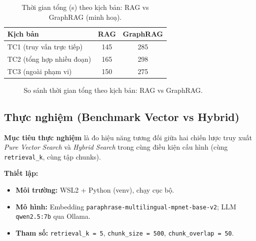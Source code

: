 \documentclass[10pt, conference, a4paper, compsocconf]{IEEEtran}
\begin{document}
\begin{table}[!htbp]
  \centering
  \caption{Thời gian tổng (s) theo kịch bản: RAG vs GraphRAG (minh hoạ).}
  \label{tab:rag-vs-graphrag}
  \begin{tabular}{lcc}
    \toprule
    \textbf{Kịch bản}         & \textbf{RAG} & \textbf{GraphRAG} \\
    \midrule
    TC1 (truy vấn trực tiếp)  & 145          & 285               \\
    TC2 (tổng hợp nhiều đoạn) & 165          & 298               \\
    TC3 (ngoài phạm vi)       & 150          & 275               \\
    \bottomrule
  \end{tabular}
\end{table}

\begin{figure}[!htbp]
  \centering
  \caption{So sánh thời gian tổng theo kịch bản: RAG vs GraphRAG.}
  \label{fig:rag-vs-graphrag}
\end{figure}

\subsection{Thực nghiệm (Benchmark Vector vs Hybrid)}
\textbf{Mục tiêu thực nghiệm} là đo hiệu năng tương đối giữa hai chiến lược truy xuất \textit{Pure Vector Search} và \textit{Hybrid Search} trong cùng điều kiện cấu hình (cùng \texttt{retrieval\_k}, cùng tập chunks).

\textbf{Thiết lập:}
\begin{itemize}
  \item \textbf{Môi trường:} WSL2 + Python (venv), chạy cục bộ.
  \item \textbf{Mô hình:} Embedding \texttt{paraphrase-multilingual-mpnet-base-v2}; LLM \texttt{qwen2.5:7b} qua Ollama.
  \item \textbf{Tham số:} \texttt{retrieval\_k = 5}, \texttt{chunk\_size = 500}, \texttt{chunk\_overlap = 50}.
\end{itemize}
\end{document}
